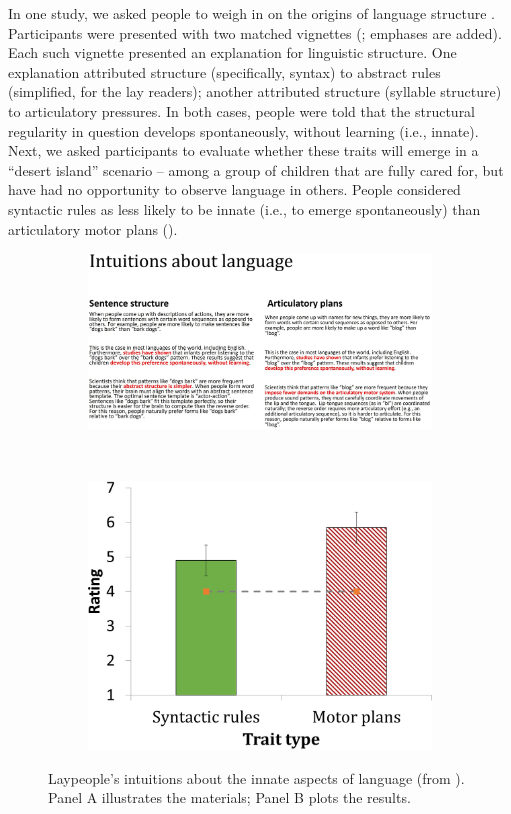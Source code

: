 \documentclass[output=paper,colorlinks,citecolor=brown
]{langscibook}
\begin{document}
In one study, we asked people to weigh in on the origins of language structure \citep{berent2019people}. Participants were presented with two matched vignettes (; emphases are added). Each such vignette presented an explanation for linguistic structure. One explanation attributed structure (specifically, syntax) to abstract rules (simplified, for the lay readers); another attributed structure (syllable structure) to articulatory pressures.  In both cases, people were told that the structural regularity in question develops spontaneously, without learning (i.e., innate). Next, we asked participants to evaluate whether these traits will emerge in a “desert island” scenario -- among a group of children that are fully cared for, but have had no opportunity to observe language in others. People considered syntactic rules as less likely to be innate (i.e., to emerge spontaneously) than articulatory motor plans (). 

\begin{figure}
    \begin{subfigure}{\textwidth}
    \includegraphics[width=\textwidth,keepaspectratio]{figures/berent_figure1a.jpg}
    \caption{}\label{fig:figure1a}
    \end{subfigure}\medskip\\
    \begin{subfigure}{\textwidth}
    \centering
    \includegraphics[width=.5\textwidth,keepaspectratio]{figures/berent_figure1b.jpg}
    \caption{}\label{fig:figure1b}
    \end{subfigure}
    \caption{Laypeople’s intuitions about the innate aspects of language (from \cite{berent2019people}).  
             Panel A illustrates the materials; Panel B plots the results.}
    \label{fig:figure1}
\end{figure}
\end{document}
